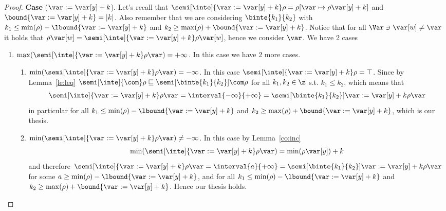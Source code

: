 \begin{proof}
  \noindent
  \textbf{Case} (\(\var := \var[y] + k\)).
  Let's recall that
  \({\semi[\inte]{\var := \var[y] + k}\rho = \rho[\var \mapsto
    \rho\var[y] + k]}\) and \(\bound{\var := \var[y] + k} =
  |k|\). Also remember that we are considering \(\binte{k_1}{k_2}\)
  with \(k_1 \leq \min(\rho) - \lbound{\var := \var[y] + k}\) and
  \(k_2 \geq \max(\rho) + \bound{\var := \var[y] + k}\). Notice that
  for all \(\Var \ni \var[w] \neq \var \) it holds that
  \(\rho\var[w] = \semi[\inte]{\var := \var[y] + k}\rho\var[w]\),
  hence we consider \(\var\). We have 2 cases
  \begin{enumerate}[label=(\arabic*)]
  \item
    \({\max(\semi[\inte]{\var := \var[y] + k}\rho\var)} =
    +\infty\). In this case we have 2 more cases.
    \begin{enumerate}[label=(\roman*)]
    \item
      \({\min(\semi[\inte]{\var := \var[y] + k}\rho\var)} =
      -\infty\). In this case
      \({\semi[\inte]{\var := \var[y] + k}\rho} = \top\). Since by
      Lemma~\ref{le:leq}
      \(\semi[\inte]{\com}\rho \sqsubseteq
      \semi[\binte{k_1}{k_2}]{\com}\rho\) for all \(k_1, k_2 \in \z\)
      s.t. \(k_1 \leq k_2\), which means that
      \begin{equation*}
        \semi[\inte]{\var := \var[y] + k}\rho\var = \interval{-\infty}{+\infty} = \semi[\binte{k_1}{k_2}]{\var := \var[y] + k}\rho\var
      \end{equation*}
      in particular for all
      \(k_1 \leq \min(\rho) - \lbound{\var := \var[y] + k}\) and
      \(k_2 \geq \max(\rho) + \bound{\var := \var[y] + k}\), which is
      our thesis.
    \item
      \({\min(\semi[\inte]{\var := \var[y] + k}\rho\var)} \neq -
      \infty\). In this case by Lemma~\ref{co:inc}
      \begin{equation*}
        \min(\semi[\inte]{\var := \var[y] + k}\rho\var) = \min(\rho\var[y]) + k
      \end{equation*}
      and therefore
      \({\semi[\inte]{\var := \var[y] + k}\rho\var} =
      \interval{a}{+\infty} = {\semi[\binte{k_1}{k_2}]{\var := \var[y]
          + k}\rho\var}\) for some
      \(a \geq \min(\rho) - \lbound{\var := \var[y] + k}\), and for
      all \(k_1 \leq \min(\rho)- \lbound{\var := \var[y] + k}\) and
      \(k_2 \geq \max(\rho) + \bound{\var := \var[y] + k}\). Hence our
      thesis holds.


\end{enumerate}
\end{enumerate}
\end{proof}
